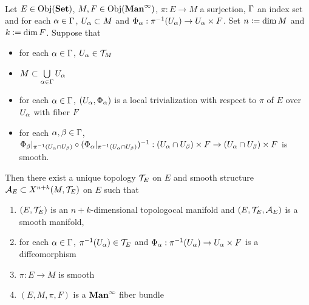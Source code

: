 \documentclass{book}
\begin{document}
	\begin{ex}   \\
		Let $E \in \operatorname{Obj}(\operatorname*{\text{\textbf{Set}}})$, $M, F \in \operatorname{Obj}(\operatorname*{\text{\textbf{Man}}^{\infty}})$, $\pi: E \rightarrow M$ a surjection, $\Gamma$ an index set and for each $\alpha \in \Gamma$, $U_{\alpha} \subset M$ and $\Phi_{\alpha}: \pi^{-1}(U_{\alpha}) \rightarrow U_{\alpha} \times F$. Set $n \vcentcolon= \dim M$ and $k \vcentcolon= \dim F$. Suppose that 
		\begin{itemize}
			\item for each $\alpha \in \Gamma$, $U_{\alpha} \in \mathcal{T}_M$
			\item $M \subset \bigcup\limits_{\alpha \in \Gamma} U_{\alpha}$ 
			\item for each $\alpha \in \Gamma$, $(U_{\alpha}, \Phi_{\alpha})$ is a local trivialization with respect to $\pi$ of $E$ over $U_{\alpha}$ with fiber $F$ 
			\item for each $\alpha,\beta \in \Gamma$, $\Phi_{\beta}|_{\pi^{-1}(U_{\alpha} \cap U_{\beta})} \circ (\Phi_{\alpha}|_{\pi^{-1}(U_{\alpha} \cap U_{\beta})})^{-1}: (U_{\alpha} \cap U_{\beta}) \times F \rightarrow  (U_{\alpha} \cap U_{\beta}) \times F$ is smooth.
		\end{itemize}
		Then there exist a unique topology $\mathcal{T}_E$ on $E$ and smooth structure $\mathcal{A}_E \subset X^{n+k}(M, \mathcal{T}_E)$ on $E$ such that
		\begin{enumerate}
			\item $(E, \mathcal{T}_E)$ is an $n+k$-dimensional topologocal manifold and $(E, \mathcal{T}_E, \mathcal{A}_E)$ is a smooth manifold,
			\item for each $\alpha \in \Gamma$, $ \pi^{-1}(U_{\alpha}) \in \mathcal{T}_E$ and $\Phi_{\alpha}: \pi^{-1}(U_{\alpha}) \rightarrow U_{\alpha} \times F$ is a diffeomorphism
			\item $\pi: E \rightarrow M$ is smooth
			\item $(E, M, \pi, F)$ is a $\operatorname*{\text{\textbf{Man}}^{\infty}}$ fiber bundle
		\end{enumerate}
	\end{ex}
\end{document}
